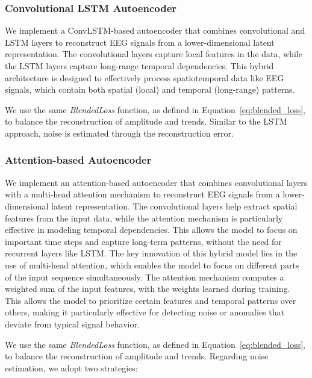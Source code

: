 \subsubsection{Convolutional LSTM Autoencoder}

We implement a ConvLSTM-based autoencoder that combines convolutional and LSTM layers to reconstruct EEG signals from a lower-dimensional latent representation. The convolutional layers capture local features in the data, while the LSTM layers capture long-range temporal dependencies. This hybrid architecture is designed to effectively process spatiotemporal data like EEG signals, which contain both spatial (local) and temporal (long-range) patterns.

We use the same \emph{BlendedLoss} function, as defined in Equation~\ref{eq:blended_loss}, to balance the reconstruction of amplitude and trends. Similar to the LSTM approach, noise is estimated through the reconstruction error.

\subsubsection{Attention-based Autoencoder}

We implement an attention-based autoencoder that combines convolutional layers with a multi-head attention mechanism to reconstruct EEG signals from a lower-dimensional latent representation. The convolutional layers help extract spatial features from the input data, while the attention mechanism is particularly effective in modeling temporal dependencies. This allows the model to focus on important time steps and capture long-term patterns, without the need for recurrent layers like LSTM. The key innovation of this hybrid model lies in the use of multi-head attention, which enables the model to focus on different parts of the input sequence simultaneously. The attention mechanism computes a weighted sum of the input features, with the weights learned during training. This allows the model to prioritize certain features and temporal patterns over others, making it particularly effective for detecting noise or anomalies that deviate from typical signal behavior.

We use the same \emph{BlendedLoss} function, as defined in Equation~\ref{eq:blended_loss}, to balance the reconstruction of amplitude and trends. Regarding noise estimation, we adopt two strategies:

